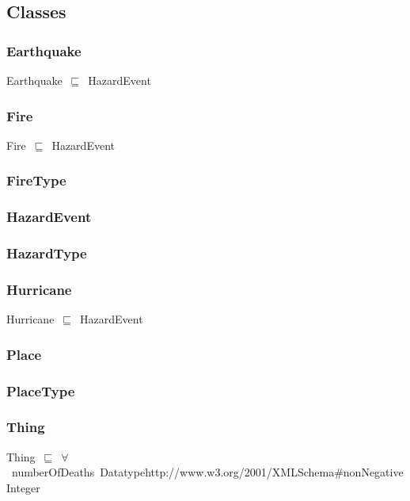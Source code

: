 \documentclass{article}
\begin{document}
\subsection*{Classes}

\subsubsection*{Earthquake}

Earthquake~\ensuremath{\sqsubseteq}~HazardEvent~

\subsubsection*{Fire}

Fire~\ensuremath{\sqsubseteq}~HazardEvent~

\subsubsection*{FireType}

\subsubsection*{HazardEvent}

\subsubsection*{HazardType}

\subsubsection*{Hurricane}

Hurricane~\ensuremath{\sqsubseteq}~HazardEvent~

\subsubsection*{Place}

\subsubsection*{PlaceType}

\subsubsection*{Thing}

Thing~\ensuremath{\sqsubseteq}~\ensuremath{\forall}~numberOfDeaths~Datatypehttp://www.w3.org/2001/XMLSchema#nonNegativeInteger~
\end{document}
